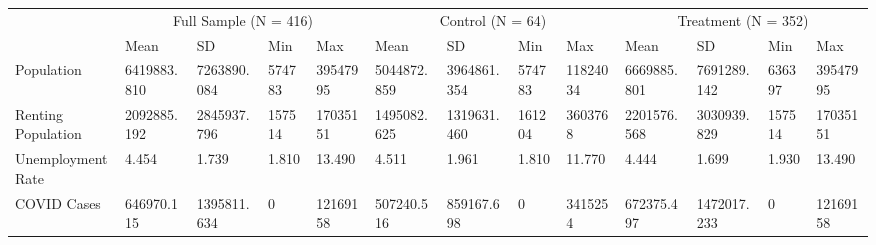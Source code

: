 \begin{tabular}{lllllllllllll}
\toprule
 & \multicolumn{4}{c}{Full Sample (N = 416)} & \multicolumn{4}{c}{Control (N = 64)} & \multicolumn{4}{c}{Treatment (N = 352)} \\
 & Mean & SD & Min & Max & Mean & SD & Min & Max & Mean & SD & Min & Max \\
\midrule
Population & 6419883.810 & 7263890.084 & 574783 & 39547995 & 5044872.859 & 3964861.354 & 574783 & 11824034 & 6669885.801 & 7691289.142 & 636397 & 39547995 \\
Renting Population & 2092885.192 & 2845937.796 & 157514 & 17035151 & 1495082.625 & 1319631.460 & 161204 & 3603768 & 2201576.568 & 3030939.829 & 157514 & 17035151 \\
Unemployment Rate & 4.454 & 1.739 & 1.810 & 13.490 & 4.511 & 1.961 & 1.810 & 11.770 & 4.444 & 1.699 & 1.930 & 13.490 \\
COVID Cases & 646970.115 & 1395811.634 & 0 & 12169158 & 507240.516 & 859167.698 & 0 & 3415254 & 672375.497 & 1472017.233 & 0 & 12169158 \\
\bottomrule
\end{tabular}
